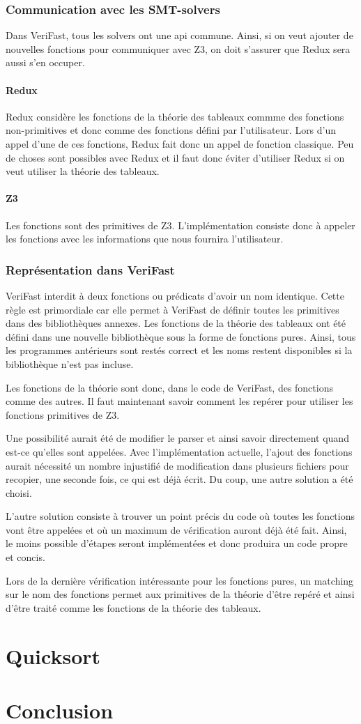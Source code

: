 \documentclass[9pt]{book}
\newcommand{\verifast}{VeriFast}
\begin{document}
		\subsection{Communication avec les SMT-solvers}
		Dans \verifast{}, tous les solvers ont une api commune. Ainsi, si on veut ajouter de nouvelles fonctions pour communiquer avec Z3, on doit s'assurer que Redux sera aussi s'en occuper.
			\subsubsection{Redux}
			Redux consid\`ere les fonctions de la th\'eorie des tableaux commme des fonctions non-primitives et donc comme des fonctions d\'efini par l'utilisateur. Lors d'un appel d'une de ces fonctions, Redux fait donc un appel de fonction classique. Peu de choses sont possibles avec Redux et il faut donc \'eviter d'utiliser Redux si on veut utiliser la th\'eorie des tableaux.
			\subsubsection{Z3}
			Les fonctions sont des primitives de Z3. L'impl\'ementation consiste donc \`a appeler les fonctions avec les informations que nous fournira l'utilisateur.
		\subsection{Repr\'esentation dans \verifast{}}
		\verifast{} interdit \`a deux fonctions ou pr\'edicats d'avoir un nom identique. Cette r\`egle est primordiale car elle permet \`a \verifast{} de d\'efinir toutes les primitives dans des biblioth\`eques annexes. Les fonctions de la th\'eorie des tableaux ont \'et\'e d\'efini dans une nouvelle biblioth\`eque sous la forme de fonctions pures. Ainsi, tous les programmes ant\'erieurs sont rest\'es correct et les noms restent disponibles si la biblioth\`eque n'est pas incluse.\par
		Les fonctions de la th\'eorie sont donc, dans le code de \verifast{}, des fonctions comme des autres. Il faut maintenant savoir comment les rep\'erer pour utiliser les fonctions primitives de Z3. \par
		Une possibilit\'e aurait \'et\'e de modifier le parser et ainsi savoir directement quand est-ce qu'elles sont appel\'ees. Avec l'impl\'ementation actuelle, l'ajout des fonctions aurait n\'ecessit\'e un nombre injustifi\'e de modification dans plusieurs fichiers pour recopier, une seconde fois, ce qui est d\'ej\`a \'ecrit. Du coup, une autre solution a \'et\'e choisi. \par
		L'autre solution consiste \`a trouver un point pr\'ecis du code o\`u toutes les fonctions vont \^etre appel\'ees et o\`u un maximum de v\'erification auront d\'ej\`a \'et\'e fait. Ainsi, le moins possible d'\'etapes seront impl\'ement\'ees et donc produira un code propre et concis.\par
		Lors de la derni\`ere v\'erification int\'eressante pour les fonctions pures, un matching sur le nom des fonctions permet aux primitives de la th\'eorie d'\^etre rep\'er\'e et ainsi d'\^etre trait\'e comme les fonctions de la th\'eorie des tableaux.

\chapter{Quicksort}
\chapter{Conclusion}
\tableofcontents
\end{document}
